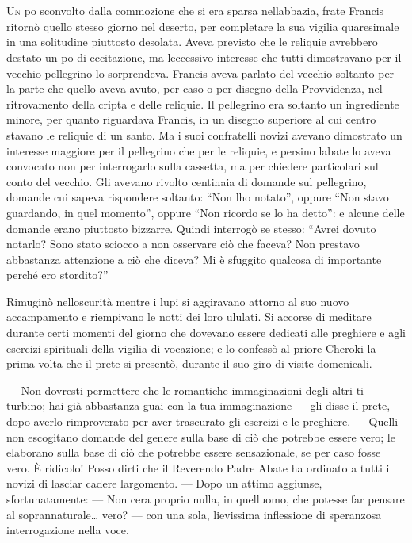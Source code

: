 	\chapter{\phantom{title}}

\lettrine{U}{n} po\textquotesingle{} sconvolto dalla commozione che si era sparsa
nell\textquotesingle abbazia, frate Francis ritornò quello stesso giorno
nel deserto, per completare la sua vigilia quaresimale in una solitudine
piuttosto desolata. Aveva previsto che le reliquie avrebbero destato un
po\textquotesingle{} di eccitazione, ma l\textquotesingle eccessivo
interesse che tutti dimostravano per il vecchio pellegrino lo
sorprendeva. Francis aveva parlato del vecchio soltanto per la parte che
quello aveva avuto, per caso o per disegno della Provvidenza, nel
ritrovamento della cripta e delle reliquie. Il pellegrino era soltanto
un ingrediente minore, per quanto riguardava Francis, in un disegno
superiore al cui centro stavano le reliquie di un santo. Ma i suoi
confratelli novizi avevano dimostrato un interesse maggiore per il
pellegrino che per le reliquie, e persino l\textquotesingle abate lo
aveva convocato non per interrogarlo sulla cassetta, ma per chiedere
particolari sul conto del vecchio. Gli avevano rivolto centinaia di
domande sul pellegrino, domande cui sapeva rispondere soltanto: ``Non
l\textquotesingle ho notato'', oppure ``Non stavo guardando, in quel
momento'', oppure ``Non ricordo se lo ha detto'': e alcune delle domande
erano piuttosto bizzarre. Quindi interrogò se stesso: ``Avrei dovuto
notarlo? Sono stato sciocco a non osservare ciò che faceva? Non prestavo
abbastanza attenzione a ciò che diceva? Mi è sfuggito qualcosa di
importante perché ero stordito?''

Rimuginò nell\textquotesingle oscurità mentre i lupi si aggiravano
attorno al suo nuovo accampamento e riempivano le notti dei loro
ululati. Si accorse di meditare durante certi momenti del giorno che
dovevano essere dedicati alle preghiere e agli esercizi spirituali della
vigilia di vocazione; e lo confessò al priore Cheroki la prima volta che
il prete si presentò, durante il suo giro di visite domenicali.

--- Non dovresti permettere che le romantiche immaginazioni degli altri
ti turbino; hai già abbastanza guai con la tua immaginazione --- gli
disse il prete, dopo averlo rimproverato per aver trascurato gli
esercizi e le preghiere. --- Quelli non escogitano domande del genere
sulla base di ciò che potrebbe essere vero; le elaborano sulla base di
ciò che potrebbe essere sensazionale, se per caso fosse vero. È
ridicolo! Posso dirti che il Reverendo Padre Abate ha ordinato a tutti i
novizi di lasciar cadere l\textquotesingle argomento. --- Dopo un attimo
aggiunse, sfortunatamente: --- Non c\textquotesingle era proprio nulla,
in quell\textquotesingle uomo, che potesse far pensare al
soprannaturale\ldots{} vero? --- con una sola, lievissima inflessione di
speranzosa interrogazione nella voce.

